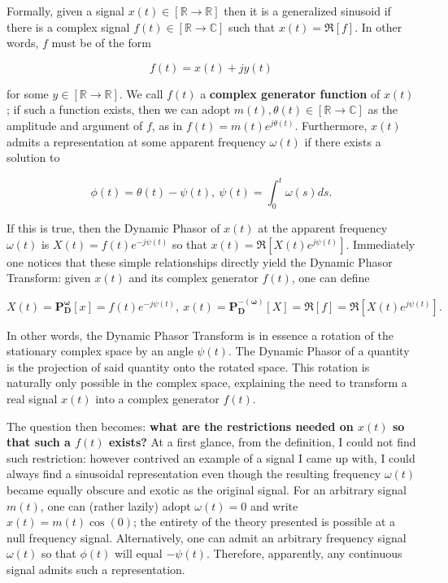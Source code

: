 	Formally, given a signal $x(t)\in\left[\mathbb{R}\to\mathbb{R}\right]$ then it is a generalized sinusoid if there is a complex signal $f(t)\in\left[\mathbb{R}\to\mathbb{C}\right]$ such that $x(t) = \Re\left[f\right]$. In other words, $f$ must be of the form

\begin{equation} f(t) = x(t) + jy(t) \label{eq:complex_extension}\end{equation}

	\noindent for some $y\in\left[\mathbb{R}\to\mathbb{R}\right]$. We call $f(t)$ a \textbf{complex generator function} of $x(t)$; if such a function exists, then we can adopt $m(t),\theta(t)\in\left[\mathbb{R}\to\mathbb{C}\right]$ as the amplitude and argument of $f$, as in $f(t) = m(t)e^{j\theta(t)}$. Furthermore, $x(t)$ admits a representation at some apparent frequency $\omega(t)$ if there exists a solution to 

\begin{equation} \phi(t) = \theta(t) - \psi(t),\ \psi(t) = \int_0^t \omega(s)ds. \end{equation}

	If this is true, then the Dynamic Phasor of $x(t)$ at the apparent frequency $\omega(t)$ is $X(t) = f(t)e^{-j\psi(t)}$ so that $x(t) = \Re\left[X(t)e^{j\psi(t)}\right]$. Immediately one notices that these simple relationships directly yield the Dynamic Phasor Transform: given $x(t)$ and its complex generator $f(t)$, one can define

\begin{equation} X(t) = \mathbf{P_D^{\omega}}\left[x\right] = f(t)e^{-j\psi(t)},\ x(t) = \mathbf{P_D^{-(\omega)}}\left[X\right] = \Re\left[f\right] = \Re\left[X(t)e^{j\psi(t)}\right] .\end{equation}

	In other words, the Dynamic Phasor Transform is in essence a rotation of the stationary complex space by an angle $\psi(t)$. The Dynamic Phasor of a quantity is the projection of said quantity onto the rotated space. This rotation is naturally only possible in the complex space, explaining the need to transform a real signal $x(t)$ into a complex generator $f(t)$.

	The question then becomes: \textbf{what are the restrictions needed on $x(t)$ so that such a $f(t)$ exists?} At a first glance, from the definition, I could not find such restriction: however contrived an example of a signal I came up with, I could always find a sinusoidal representation even though the resulting frequency $\omega(t)$ became equally obscure and exotic as the original signal. For an arbitrary signal $m(t)$, one can (rather lazily) adopt $\omega(t) = 0$ and write $x(t) = m(t)\cos\left(0\right)$; the entirety of the theory presented is possible at a null frequency signal. Alternatively, one can admit an arbitrary frequency signal $\omega(t)$ so that $\phi(t)$ will equal $-\psi(t)$. Therefore, apparently, any continuous signal admits such a representation.

